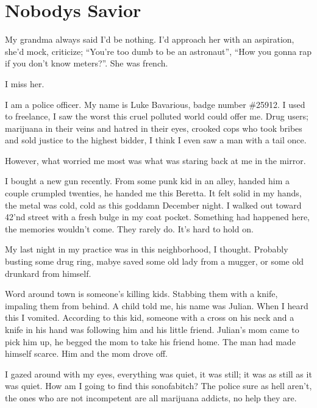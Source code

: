 \chapter{Nobodys Savior}





My grandma always said I'd be nothing. I'd approach her with an
aspiration, she'd mock, criticize; ``You're too dumb to be an
astronaut'', ``How you gonna rap if you don't know meters?''. She was
french.



I miss her.



I am a police officer. My name is Luke Bavarious, badge number
\#25912. I used to freelance, I saw the worst this cruel polluted
world could offer me. Drug users; marijuana in their veins and
hatred in their eyes, crooked cops who took bribes and sold justice
to the highest bidder, I think I even saw a man with a tail
once.



However, what worried me most was what was staring back at me in
the mirror.



I bought a new gun recently. From some punk kid in an alley, handed
him a couple crumpled twenties, he handed me this Beretta. It felt
solid in my hands, the metal was cold, cold as this goddamn
December night. I walked out toward 42'nd street with a fresh bulge
in my coat pocket. Something had happened here, the memories
wouldn't come. They rarely do. It's hard to hold on.



My last night in my practice was in this neighborhood, I thought.
Probably busting some drug ring, mabye saved some old lady from a
mugger, or some old drunkard from himself.



Word around town is someone's killing kids. Stabbing them with a
knife, impaling them from behind. A child told me, his name was
Julian. When I heard this I vomited. According to this kid, someone
with a cross on his neck and a knife in his hand was following him
and his little friend. Julian's mom came to pick him up, he begged
the mom to take his friend home. The man had made himself scarce.
Him and the mom drove off.



I gazed around with my eyes, everything was quiet, it was still; it
was as still as it was quiet. How am I going to find this
sonofabitch? The police sure as hell aren't, the ones who are not
incompetent are all marijuana addicts, no help they are.



